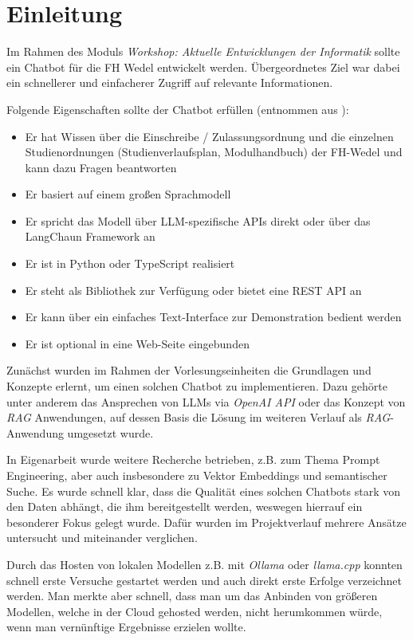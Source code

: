 \chapter{Einleitung}
\label{chap: intro}

Im Rahmen des Moduls \emph{Workshop: Aktuelle Entwicklungen der Informatik}
sollte ein Chatbot für die FH Wedel entwickelt werden.
Übergeordnetes Ziel war dabei ein schnellerer und einfacherer Zugriff auf
relevante Informationen.

Folgende Eigenschaften sollte der Chatbot erfüllen (entnommen aus \cite{aufgabenstellung}):

\begin{itemize}
    \item Er hat Wissen über die Einschreibe / Zulassungsordnung und die einzelnen Studienordnungen (Studienverlaufsplan, Modulhandbuch) der FH-Wedel und kann dazu Fragen beantworten
    \item Er basiert auf einem großen Sprachmodell
    \item Er spricht das Modell über LLM-spezifische APIs direkt oder über das LangChaun Framework an
    \item Er ist in Python oder TypeScript realisiert
    \item Er steht als Bibliothek zur Verfügung oder bietet eine REST API an
    \item Er kann über ein einfaches Text-Interface zur Demonstration bedient werden
    \item Er ist optional in eine Web-Seite eingebunden
\end{itemize}

Zunächst wurden im Rahmen der Vorlesungseinheiten die Grundlagen und Konzepte erlernt,
um einen solchen Chatbot zu implementieren. Dazu gehörte unter anderem das Ansprechen
von LLMs via \emph{OpenAI API} oder das Konzept von \emph{RAG} Anwendungen, auf dessen
Basis die Lösung im weiteren Verlauf als \emph{RAG}-Anwendung umgesetzt wurde.

In Eigenarbeit wurde weitere Recherche betrieben, z.B. zum Thema Prompt Engineering, aber auch 
insbesondere zu Vektor Embeddings und semantischer Suche. Es wurde schnell klar, dass die Qualität
eines solchen Chatbots stark von den Daten abhängt, die ihm bereitgestellt werden,
weswegen hierrauf ein besonderer Fokus gelegt wurde. Dafür wurden im Projektverlauf
mehrere Ansätze untersucht und miteinander verglichen.

Durch das Hosten von lokalen Modellen z.B. mit \emph{Ollama} oder \emph{llama.cpp}
konnten schnell erste Versuche gestartet werden und auch direkt erste
Erfolge verzeichnet werden. Man merkte aber schnell, dass man um
das Anbinden von größeren Modellen, welche in der Cloud gehosted werden, nicht
herumkommen würde, wenn man vernünftige Ergebnisse erzielen wollte.


